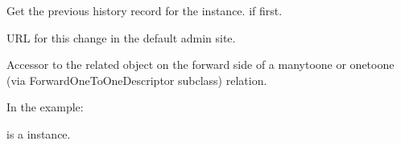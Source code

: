 \documentclass[letterpaper,10pt,english]{sphinxmanual}
\begin{document}
\begin{fulllineitems}

\begin{fulllineitems}
\label{\detokenize{masterCodeDoc:aemter.models.HistoricalFunktion.prev_record}}
Get the previous history record for the instance.  if first.

\end{fulllineitems}


\begin{fulllineitems}
\label{\detokenize{masterCodeDoc:aemter.models.HistoricalFunktion.revert_url}}
URL for this change in the default admin site.

\end{fulllineitems}


\begin{fulllineitems}
\label{\detokenize{masterCodeDoc:aemter.models.HistoricalFunktion.unterbereich}}
Accessor to the related object on the forward side of a many\sphinxhyphen{}to\sphinxhyphen{}one or
one\sphinxhyphen{}to\sphinxhyphen{}one (via ForwardOneToOneDescriptor subclass) relation.

In the example:

\begin{sphinxVerbatim}[commandchars=\\\{\}]
 
       
\end{sphinxVerbatim}

 is a  instance.


\end{fulllineitems}
\end{fulllineitems}
\end{document}
